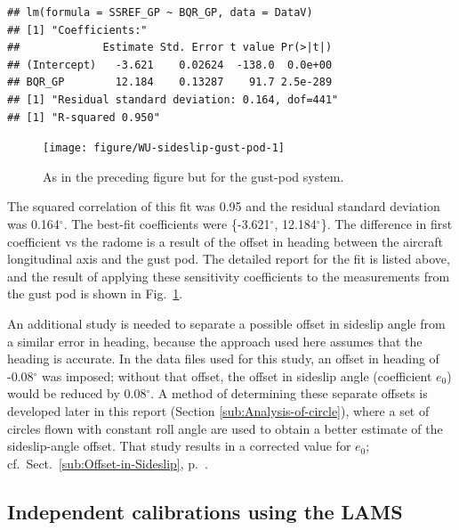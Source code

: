 \documentclass[12pt,twoside,english]{article}\usepackage[]{graphicx}\usepackage[]{color}
\makeatletter
\newenvironment{kframe}{%
 \def\at@end@of@kframe{}%
 \ifinner\ifhmode%
  \def\at@end@of@kframe{\end{minipage}}%
  \begin{minipage}{\columnwidth}%
 \fi\fi%
 \def\FrameCommand##1{\hskip\@totalleftmargin \hskip-\fboxsep
 \colorbox{shadecolor}{##1}\hskip-\fboxsep
     \hskip-\linewidth \hskip-\@totalleftmargin \hskip\columnwidth}%
 \MakeFramed {\advance\hsize-\width
   \@totalleftmargin\z@ \linewidth\hsize
   \@setminipage}}%
 {\par\unskip\endMakeFramed%
 \at@end@of@kframe}
\newenvironment{knitrout}{}{} %
\makeatother
\begin{document}
\begin{knitrout}\footnotesize
{}\color{fgcolor}\begin{kframe}
\begin{verbatim}
## lm(formula = SSREF_GP ~ BQR_GP, data = DataV)
## [1] "Coefficients:"
##             Estimate Std. Error t value Pr(>|t|)
## (Intercept)   -3.621    0.02624  -138.0  0.0e+00
## BQR_GP        12.184    0.13287    91.7 2.5e-289
## [1] "Residual standard deviation: 0.164, dof=441"
## [1] "R-squared 0.950"
\end{verbatim}
\end{kframe}\begin{figure}

{\centering \texttt{[image: figure/WU-sideslip-gust-pod-1]} 

}

\caption[As in the preceding figure but for the gust-pod system]{As in the preceding figure but for the gust-pod system.}\label{fig:sideslip-gust-pod}
\end{figure}


\end{knitrout}

The squared correlation of this fit was 0.95 and the residual standard deviation was 0.164$^{\circ}$. The best-fit coefficients were \{-3.621$^{\circ}$, 
12.184$^{\circ}$\}. The difference in first coefficient vs the radome is a result of the offset in heading between the aircraft longitudinal axis and the gust pod. The detailed report for the fit is listed above, and the result of applying these sensitivity coefficients to the measurements from the gust pod is shown in Fig.~\ref{fig:sideslip-gust-pod}. 

An additional study is needed to separate a possible offset in sideslip angle from a similar error in heading, because the approach used here assumes that the heading is accurate. In the data files used for this study, an offset in heading of -0.08$^{\circ}$ was imposed; without that offset, the offset in sideslip angle (coefficient $e_{0}$) would be reduced by 0.08$^{\circ}$. A method of determining these separate offsets is developed later in this report (Section \ref{sub:Analysis-of-circle}), where a set of circles flown with constant roll angle are used to obtain a better estimate of the sideslip-angle offset. That study results in a corrected value for $e_{0}$; cf.~Sect.~\ref{sub:Offset-in-Sideslip}, p.~\pageref{page:SSoffset}. 

\subsection{Independent calibrations using the LAMS\label{sub:LAMS-aoa-and-sideslip}}
\end{document}
